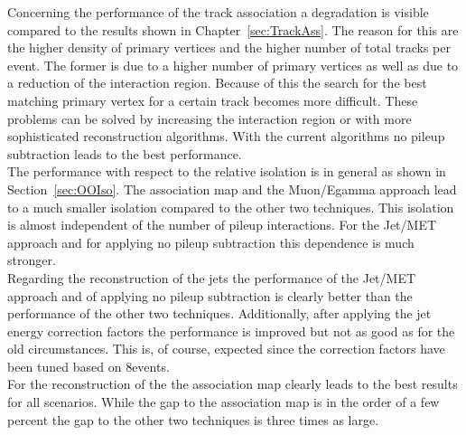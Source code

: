 Concerning the performance of the track association a degradation is visible compared to the results shown in Chapter~\ref{sec:TrackAss}. The reason for this are the higher density of primary vertices and the higher number of total tracks per event. The former is due to a higher number of primary vertices as well as due to a reduction of the interaction region. Because of this the search for the best matching primary vertex for a certain track becomes more difficult. These problems can be solved by increasing the interaction region or with more sophisticated reconstruction algorithms. With the current algorithms no pileup subtraction leads to the best performance. \\
The performance with respect to the relative isolation is in general as shown in Section~\ref{sec:OOIso}. The association map and the Muon/Egamma approach lead to a much smaller isolation compared to the other two techniques. This isolation is almost independent of the number of pileup interactions. For the Jet/MET approach and for applying no pileup subtraction this dependence is much stronger. \\
Regarding the reconstruction of the jets the performance of the Jet/MET approach and of applying no pileup subtraction is clearly better than the performance of the other two techniques. Additionally, after applying the jet energy correction factors the performance is improved but not as good as for the old circumstances. This is, of course, expected since the correction factors have been tuned based on 8\TeV events. \\
For the reconstruction of the \MET{} the association map clearly leads to the best results for all scenarios. While the gap to the association map is in the order of a few percent the gap to the other two techniques is three times as large.
